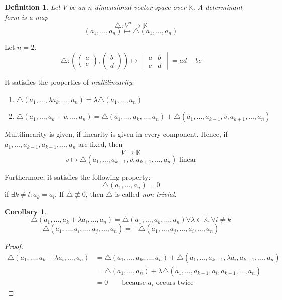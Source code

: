 \documentclass{article}
\newtheorem{definition}{Definition}  \numberwithin{definition}{section}
\newtheorem*{corollary}{Corollary}%
\newcommand{\vectwo}[2]{\begin{pmatrix} #1 \\ #2 \end{pmatrix}}
\begin{document}
\begin{definition}
  Let $V$ be an $n$-dimensional vector space over $\mathbb K$.
  A \emph{determinant form} is a map
  \[ \triangle: V^n \to \mathbb K \]
  \[ (a_1, \ldots, a_n) \mapsto \triangle (a_1, \ldots, a_n) \]
\end{definition}
Let $n=2$.
\[ \triangle: \left(\vectwo ac, \vectwo bd\right) \mapsto \begin{vmatrix} a & b \\ c & d \end{vmatrix} = ad - bc \]

It satisfies the properties of \emph{multilinearity}:
\begin{enumerate}
  \item $\triangle(a_1, \dots, \lambda a_k, \dots, a_n) = \lambda \triangle(a_1, \dots, a_n)$
  \item $\triangle(a_1, \dots, a_k + v, \dots, a_n) = \triangle(a_1, \dots, a_k, \dots, a_n) + \triangle(a_1, \dots, a_{k-1}, v, a_{k+1}, \dots, a_n)$
\end{enumerate}
Multilinearity is given, if linearity is given in every component.
Hence, if $a_1, \dots, a_{k-1}, a_{k+1}, \dots, a_n$ are fixed, then
\[ V \to \mathbb K \]
\[ v \mapsto \triangle (a_1, \dots, a_{k-1}, v, a_{k+1}, \dots, a_n) \text{ linear} \]


Furthermore, it satisfies the following property:
\[ \triangle(a_1, \dots, a_n) = 0 \]
if $\exists k \neq l: a_k = a_l$.
If $\triangle \not\equiv 0$, then $\triangle$ is called \emph{non-trivial}.

\begin{corollary} %
  \[ \triangle(a_1, \dots, a_k + \lambda a_i, \dots, a_n) = \triangle(a_1, \dots, a_k, \dots, a_n) \forall \lambda \in \mathbb K, \forall i \neq k \]
  \[ \triangle(a_1, \dots, a_i, \dots, a_j, \dots, a_n) = -\triangle(a_1, \dots, a_j, \dots, a_i, \dots, a_n) \]
\end{corollary}
\begin{proof}
  \begin{align*}
    \triangle(a_1, \dots, a_k + \lambda a_i, \dots, a_n)
      &= \triangle (a_1, \dots, a_k, \dots, a_n) + \triangle (a_1, \dots, a_{k-1}, \lambda a_i, a_{k+1}, \dots, a_n) \\
      &= \triangle (a_1, \dots, a_n) + \lambda \triangle (a_1, \dots, a_{k-1}, a_i, a_{k+1}, \dots, a_n) \\
      &= 0 \qquad \text{because $a_i$ occurs twice}
  \end{align*}
\end{proof}
\end{document}
